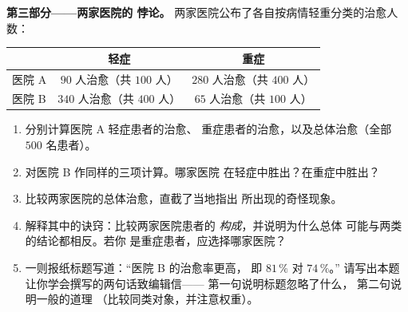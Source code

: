 \begin{problem}
\medskip
\noindent\textbf{第三部分——两家医院的
悖论。}
两家医院公布了各自按病情轻重分类的治愈人数：
\begin{center}
\renewcommand{\arraystretch}{1.3}
\begin{tabular}{l|cc}
 & 轻症 & 重症 \\
\hline
医院 A & $90$ 人治愈（共 $100$ 人）& $280$ 人治愈（共 $400$ 人）\\
医院 B & $340$ 人治愈（共 $400$ 人）& $65$ 人治愈（共 $100$ 人）\\
\end{tabular}
\end{center}
\begin{enumerate}[resume]
  \item 分别计算医院 A 轻症患者的治愈、
        重症患者的治愈，以及总体治愈（全部 $500$ 名患者）。
  \item 对医院 B 作同样的三项计算。哪家医院
        在轻症中胜出？在重症中胜出？
  \item 比较两家医院的总体治愈，直截了当地指出
        所出现的奇怪现象。
  \item 解释其中的诀窍：比较两家医院患者的
        \emph{构成}，并说明为什么总体
        可能与两类的结论都相反。若你
        是重症患者，应选择哪家医院？
  \item 一则报纸标题写道：“医院 B 的治愈率更高，
        即 $81\,\%$ 对 $74\,\%$。”
        请写出本题让你学会撰写的两句话致编辑信——
        第一句说明标题忽略了什么，
        第二句说明一般的道理
        （比较同类对象，并注意权重）。
\end{enumerate}
\end{problem}
